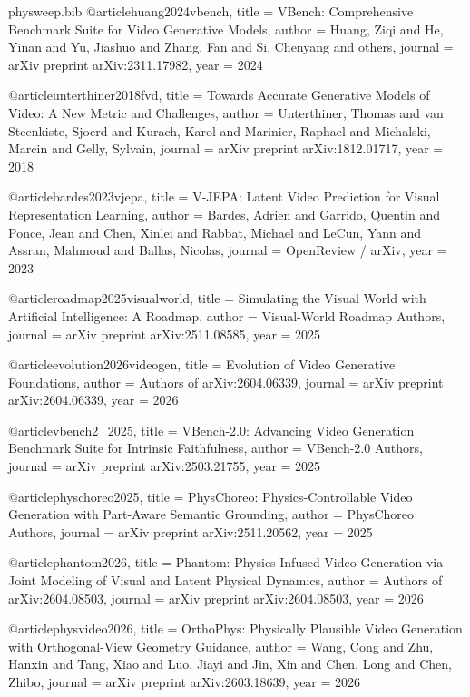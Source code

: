 \begin{filecontents}{physweep.bib}
@article{huang2024vbench,
  title   = {{VBench}: Comprehensive Benchmark Suite for Video Generative Models},
  author  = {Huang, Ziqi and He, Yinan and Yu, Jiashuo and Zhang, Fan and Si, Chenyang and others},
  journal = {arXiv preprint arXiv:2311.17982},
  year    = {2024}
}

@article{unterthiner2018fvd,
  title   = {Towards Accurate Generative Models of Video: A New Metric and Challenges},
  author  = {Unterthiner, Thomas and van Steenkiste, Sjoerd and Kurach, Karol and Marinier, Raphael and Michalski, Marcin and Gelly, Sylvain},
  journal = {arXiv preprint arXiv:1812.01717},
  year    = {2018}
}

@article{bardes2023vjepa,
  title   = {{V-JEPA}: Latent Video Prediction for Visual Representation Learning},
  author  = {Bardes, Adrien and Garrido, Quentin and Ponce, Jean and Chen, Xinlei and Rabbat, Michael and LeCun, Yann and Assran, Mahmoud and Ballas, Nicolas},
  journal = {OpenReview / arXiv},
  year    = {2023}
}

@article{roadmap2025visualworld,
  title   = {Simulating the Visual World with Artificial Intelligence: A Roadmap},
  author  = {{Visual-World Roadmap Authors}},
  journal = {arXiv preprint arXiv:2511.08585},
  year    = {2025}
}

@article{evolution2026videogen,
  title   = {Evolution of Video Generative Foundations},
  author  = {{Authors of arXiv:2604.06339}},
  journal = {arXiv preprint arXiv:2604.06339},
  year    = {2026}
}

@article{vbench2_2025,
  title   = {{VBench-2.0}: Advancing Video Generation Benchmark Suite for Intrinsic Faithfulness},
  author  = {{VBench-2.0 Authors}},
  journal = {arXiv preprint arXiv:2503.21755},
  year    = {2025}
}

@article{physchoreo2025,
  title   = {{PhysChoreo}: Physics-Controllable Video Generation with Part-Aware Semantic Grounding},
  author  = {{PhysChoreo Authors}},
  journal = {arXiv preprint arXiv:2511.20562},
  year    = {2025}
}

@article{phantom2026,
  title   = {{Phantom}: Physics-Infused Video Generation via Joint Modeling of Visual and Latent Physical Dynamics},
  author  = {{Authors of arXiv:2604.08503}},
  journal = {arXiv preprint arXiv:2604.08503},
  year    = {2026}
}

@article{physvideo2026,
  title   = {{OrthoPhys}: Physically Plausible Video Generation with Orthogonal-View Geometry Guidance},
  author  = {Wang, Cong and Zhu, Hanxin and Tang, Xiao and Luo, Jiayi and Jin, Xin and Chen, Long and Chen, Zhibo},
  journal = {arXiv preprint arXiv:2603.18639},
  year    = {2026}
}


\end{filecontents}

